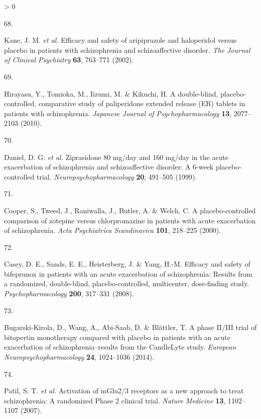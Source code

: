 \documentclass[
  9pt,
  english,
  ,jou,floatsintext]{apa6}
\newlength{\cslhangindent}
\newlength{\csllabelwidth}
\newenvironment{CSLReferences}[2] %
 {%
  \setlength{\parindent}{0pt}
  \ifodd #1 \everypar{\setlength{\hangindent}{\cslhangindent}}\ignorespaces\fi
  \ifnum #2 > 0
  \setlength{\parskip}{#2\baselineskip}
  \fi
 }%
 {}
\newcommand{\CSLLeftMargin}[1]{\parbox[t]{\csllabelwidth}{#1}}
\newcommand{\CSLRightInline}[1]{\parbox[t]{\linewidth - \csllabelwidth}{#1}\break}
\begin{document}
\begin{CSLReferences}{0}{0}
\leavevmode\hypertarget{ref-Kane2002}{}%
\CSLLeftMargin{68. }
\CSLRightInline{Kane, J. M. \emph{et al.} Efficacy and safety of aripiprazole and haloperidol versus placebo in patients with schizophrenia and schizoaffective disorder. \emph{The Journal of Clinical Psychiatry} \textbf{63}, 763--771 (2002).}

\leavevmode\hypertarget{ref-Hirayasu2010}{}%
\CSLLeftMargin{69. }
\CSLRightInline{Hirayasu, Y., Tomioka, M., Iizumi, M. \& Kikuchi, H. A double-blind, placebo-controlled, comparative study of paliperidone extended release (ER) tablets in patients with schizophrenia. \emph{Japanese Journal of Psychopharmacology} \textbf{13}, 2077--2103 (2010).}

\leavevmode\hypertarget{ref-Daniel1999}{}%
\CSLLeftMargin{70. }
\CSLRightInline{Daniel, D. G. \emph{et al.} Ziprasidone 80 mg/day and 160 mg/day in the acute exacerbation of schizophrenia and schizoaffective disorder: A 6-week placebo-controlled trial. \emph{Neuropsychopharmacology} \textbf{20}, 491--505 (1999).}

\leavevmode\hypertarget{ref-Cooper2000}{}%
\CSLLeftMargin{71. }
\CSLRightInline{Cooper, S., Tweed, J., Raniwalla, J., Butler, A. \& Welch, C. A placebo-controlled comparison of zotepine versus chlorpromazine in patients with acute exacerbation of schizophrenia. \emph{Acta Psychiatrica Scandinavica} \textbf{101}, 218--225 (2000).}

\leavevmode\hypertarget{ref-Casey2008}{}%
\CSLLeftMargin{72. }
\CSLRightInline{Casey, D. E., Sands, E. E., Heisterberg, J. \& Yang, H.-M. Efficacy and safety of bifeprunox in patients with an acute exacerbation of schizophrenia: Results from a randomized, double-blind, placebo-controlled, multicenter, dose-finding study. \emph{Psychopharmacology} \textbf{200}, 317--331 (2008).}

\leavevmode\hypertarget{ref-Bugarski2014}{}%
\CSLLeftMargin{73. }
\CSLRightInline{Bugarski-Kirola, D., Wang, A., Abi-Saab, D. \& Blättler, T. A phase II/III trial of bitopertin monotherapy compared with placebo in patients with an acute exacerbation of schizophrenia--results from the CandleLyte study. \emph{European Neuropsychopharmacology} \textbf{24}, 1024--1036 (2014).}

\leavevmode\hypertarget{ref-Patil2007}{}%
\CSLLeftMargin{74. }
\CSLRightInline{Patil, S. T. \emph{et al.} Activation of {mGlu2}/3 receptors as a new approach to treat schizophrenia: A randomized {Phase} 2 clinical trial. \emph{Nature Medicine} \textbf{13}, 1102--1107 (2007).}


\end{CSLReferences}
\end{document}
